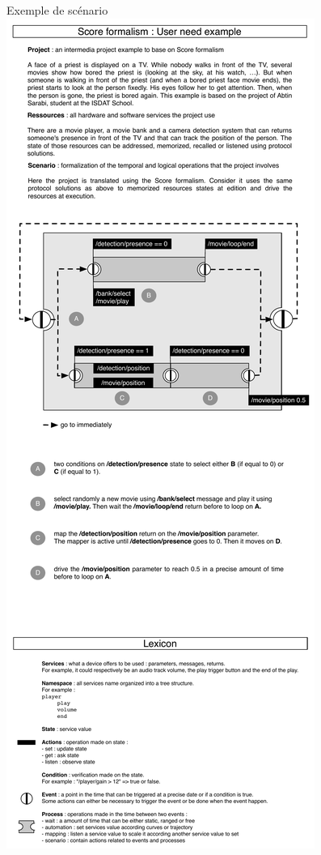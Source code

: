 \begin{frame}{Exemple de scénario}
	\includegraphics[scale=0.5,clip,trim=0cm 28cm 0cm 13cm]{../src/images/moineOSSIA.pdf}
\end{frame}

